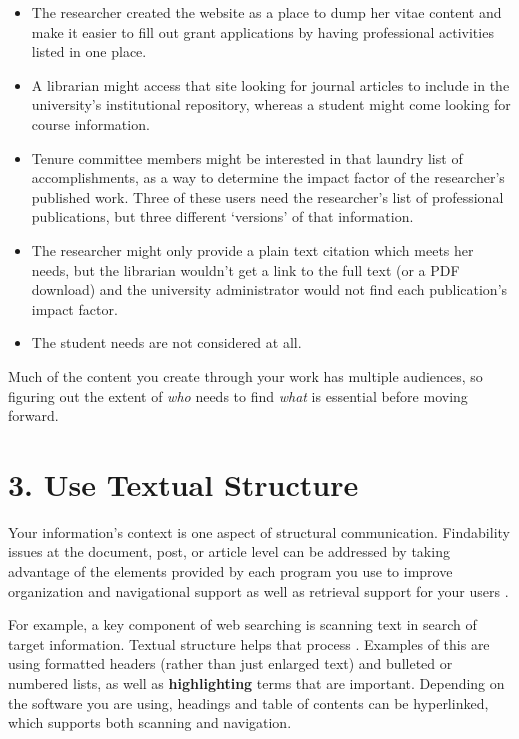 \documentclass[10pt,letterpaper]{article}
\newcommand{\rulemajor}[1]{\section*{#1}}
\begin{document}
\begin{itemize}

\item
  The researcher created the website as a place to dump her vitae content and
  make it easier to fill out grant applications by having professional
  activities listed in one place.

\item
  A librarian might access that site looking for journal articles to include in
  the university's institutional repository, whereas a student might come
  looking for course information.

\item
  Tenure committee members might be interested in that laundry list of
  accomplishments, as a way to determine the impact factor of the researcher's
  published work. Three of these users need the researcher's list of
  professional publications, but three different `versions' of that information.

\item
  The researcher might only provide a plain text citation which meets her needs,
  but the librarian wouldn't get a link to the full text (or a PDF download) and
  the university administrator would not find each publication's impact factor.

\item
  The student needs are not considered at all.

\end{itemize}

Much of the content you create through your work has multiple audiences, so
figuring out the extent of \emph{who} needs to find \emph{what} is essential
before moving forward.

\rulemajor{3. Use Textual Structure}

Your information's context is one aspect of structural communication.
Findability issues at the document, post, or article level can be addressed by
taking advantage of the elements provided by each program you use to improve
organization and navigational support as well as retrieval support for your
users \cite{Hedden2016}.

For example, a key component of web searching is scanning text in search of
target information. Textual structure helps that process \cite{Krug2014}.
Examples of this are using formatted headers (rather than just enlarged text)
and bulleted or numbered lists, as well as \textbf{highlighting} terms that are
important. Depending on the software you are using, headings and table of
contents can be hyperlinked, which supports both scanning and navigation.
\end{document}
